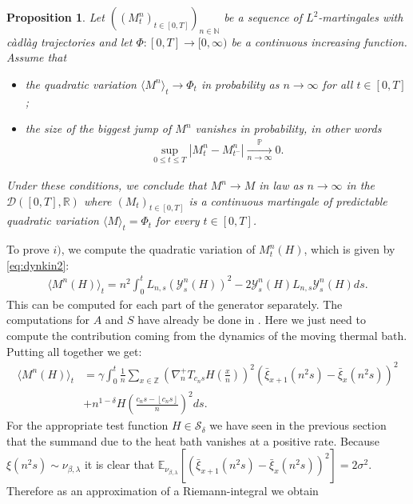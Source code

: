 \documentclass[a4paper, reqno, 12pt]{amsart}
\theoremstyle{plain}
\newtheorem{prop}[definition]{Proposition}
\theoremstyle{definition}
\newcommand{\floor}[1]{\left\lfloor #1 \right\rfloor}
\newcommand{\ee}[1]{\mathbb{E}_{\nu_{\beta,\lambda}}\left[ #1 \right]}
\newcommand{\R}{\mathbb{R}}
\newcommand{\Z}{\mathbb{Z}}
\newcommand{\N}{\mathbb{N}}
\begin{document}
\begin{prop} \label{prop:martconvergence}
    Let $((M^n_t)_{t\in[0,T]})_{n\in\N}$ be a sequence of $L^2$-martingales with càdlàg trajectories and let $\Phi:[0,T]\to[0,\infty)$ be a continuous increasing function. Assume that
    \begin{itemize}
        \item[i)] the quadratic variation $\langle M^n\rangle_t\to \Phi_t$ in probability as $n\to \infty$ for all $t\in[0,T]$;
        \item[ii)] the size of the biggest jump of $M^n$ vanishes in probability, in other words
        \begin{align*}
            \sup_{0\leq t\leq T} |M^n_t - M^n_{t^-}| \xrightarrow[n\to\infty]{\mathbb P} 0.
        \end{align*}
    \end{itemize}
    Under these conditions, we conclude that $M^n\to M$ in law as $n\to\infty$ in the $\mathcal D([0,T],\R)$ where $(M_t)_{t\in[0,T]}$ is a continuous martingale of predictable quadratic variation $\langle M\rangle_t = \Phi_t$ for every $t\in[0,T]$.
\end{prop}
To prove $i)$, we compute the quadratic variation of $M^n_t(H)$, which  is given by  \eqref{eq:dynkin2}:
\begin{align*}
    \langle M^n(H) \rangle_t  = n^2\int_0^t L_{n,s}(\mathcal{Y}^n_s(H))^2 - 2\mathcal{Y}^n_s(H)L_{n,s}\mathcal{Y}^n_s(H) ds.
\end{align*}
This can be computed for each part of the generator separately. The computations for  $A$ and  $S$ have already be done in \cite{ABGS22}. Here we just need to compute the contribution coming from the dynamics of the moving thermal bath. Putting all together we get:
\begin{equation}\label{eq:quadvar}\begin{split}
    \langle M^n(H)\rangle_t &=\gamma \int_0^t\frac{1} {n}\sum_{x\in\Z} \left(\nabla^+_nT_{c_ns}H\left(\frac{x}{n}\right)\right)^2 \left(\bar{\xi}_{x+1}(n^2s) -\bar{\xi}_x(n^2s)\right)^2\\&+ n^{1-\delta} H\left(\frac{c_ns-\floor{c_ns}}{n}\right)^2 ds .
\end{split}\end{equation}
For the appropriate test function $H\in\mathcal S_{\delta}$ we have seen in the previous section that the summand due to the heat bath vanishes at a positive rate. 
Because $\xi(n^2s) \sim \nu_{\beta,\lambda}$ it is clear that $\ee{(\bar{\xi}_{x+1}(n^2 s) -\bar{\xi}_x(n^2 s))^2} = 2\sigma^2$. Therefore as an approximation of a Riemann-integral we obtain
\end{document}
